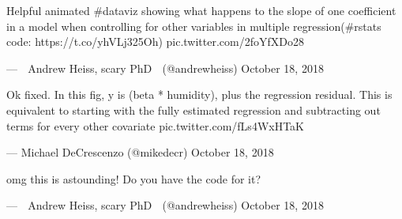 \documentclass[]{article}
\theoremstyle{definition}
\theoremstyle{definition}
\theoremstyle{definition}
\theoremstyle{remark}
\begin{document}
Helpful animated \#dataviz showing what happens to the slope of one
coefficient in a model when controlling for other variables in multiple
regression(\#rstats code: https://t.co/yhVLj325Oh)
pic.twitter.com/2foYfXDo28

--- 🎃 Andrew Heiss, scary PhD 🦇 (@andrewheiss) October 18, 2018

Ok fixed. In this fig, y is (beta * humidity), plus the regression
residual. This is equivalent to starting with the fully estimated
regression and subtracting out terms for every other covariate
pic.twitter.com/fLs4WxHTaK

--- Michael DeCrescenzo (@mikedecr) October 18, 2018

omg this is astounding! Do you have the code for it?

--- 🎃 Andrew Heiss, scary PhD 🦇 (@andrewheiss) October 18, 2018
\end{document}
